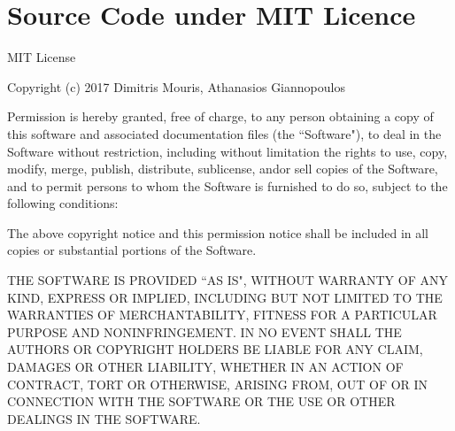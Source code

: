 \chapter{Source Code under MIT Licence}\label{AppendixA}

MIT License
\medskip

Copyright (c) 2017 Dimitris Mouris, Athanasios Giannopoulos
\medskip

Permission is hereby granted, free of charge, to any person obtaining a copy of this software and associated documentation files (the ``Software"), to deal in the Software without restriction, including without limitation the rights to use, copy, modify, merge, publish, distribute, sublicense, and\myslash or sell copies of the Software, and to permit persons to whom the Software is furnished to do so, subject to the following conditions:
\medskip

The above copyright notice and this permission notice shall be included in all copies or substantial portions of the Software.\par
\medskip

THE SOFTWARE IS PROVIDED ``AS IS", WITHOUT WARRANTY OF ANY KIND, EXPRESS OR IMPLIED, INCLUDING BUT NOT LIMITED TO THE WARRANTIES OF MERCHANTABILITY, FITNESS FOR A PARTICULAR PURPOSE AND NONINFRINGEMENT.
IN NO EVENT SHALL THE AUTHORS OR COPYRIGHT HOLDERS BE LIABLE FOR ANY CLAIM, DAMAGES OR OTHER LIABILITY, WHETHER IN AN ACTION OF CONTRACT, TORT OR OTHERWISE, ARISING FROM, OUT OF OR IN CONNECTION WITH THE SOFTWARE OR THE USE OR OTHER DEALINGS IN THE SOFTWARE.
